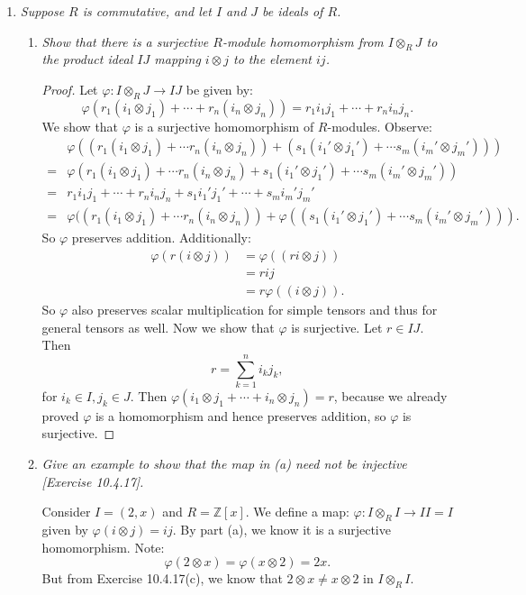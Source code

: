 \documentclass[9pt,reqno,twoside]{amsbook}
\theoremstyle{plain}
\numberwithin{section}{chapter}
\numberwithin{equation}{chapter}
\theoremstyle{definition}
\theoremstyle{remark}
\theoremstyle{plain}
\newcommand{\z}{\mathbb{Z}}
\newcommand{\bee}{\begin{equation}\begin{aligned}}
\newcommand{\eee}{\end{aligned}\end{equation}}
\newcommand{\tens}{\otimes}
\renewcommand{\phi}{\varphi}
\begin{document}
\begin{enumerate}[label=\arabic*.]
\item \textit{Suppose $R$ is commutative, and let $I$ and $J$ be ideals of $R$. }

\begin{enumerate}
\item \textit{Show that there is a surjective $R$-module homomorphism from $I \tens_R J$ to the product ideal $IJ$ mapping $i \tens j$ to the element $ij$. }

\begin{proof}
Let $\phi:I \tens_R J \to IJ$ be given by:
 $$
 \phi(r_1(i_1 \tens j_1) + \cdots + r_n(i_n \tens j_n)) = r_1i_1j_1 + \cdots + r_ni_nj_n.
 $$
  We show that $\phi$ is a surjective homomorphism of $R$-modules. Observe:
\bee
&\phi((r_1(i_1 \tens j_1) + \cdots r_n(i_n \tens j_n)) + (s_1(i_1' \tens j_1') + \cdots s_m(i_m' \tens j_m')))\\
= &\phi(r_1(i_1 \tens j_1) + \cdots r_n(i_n \tens j_n)+ s_1(i_1' \tens j_1') + \cdots s_m(i_m' \tens j_m'))\\
 = &r_1i_1j_1 + \cdots + r_ni_nj_n + s_1i_1'j_1' + \cdots + s_mi_m'j_m'\\
= &\phi((r_1(i_1 \tens j_1) + \cdots r_n(i_n \tens j_n)) + \phi((s_1(i_1' \tens j_1') + \cdots s_m(i_m' \tens j_m'))).
\eee
So $\phi$ preserves addition. Additionally:
\bee
\phi(r(i \tens j)) 
&= \phi((ri \tens j))\\
&= rij\\
&= r\phi((i \tens j)).
\eee
So $\phi$ also preserves scalar multiplication for simple tensors and thus for general tensors as well. Now we show that $\phi$ is surjective. Let $r \in IJ$. Then 
$$
r = \sum_{k = 1}^n i_kj_k,
$$ 
for $i_k \in I,j_k \in J$. Then $\phi(i_1 \tens j_1 + \cdots + i_n \tens j_n) = r$, because we already proved $\phi$ is a homomorphism and hence preserves addition, so $\phi$ is surjective. 
\end{proof}

\item \textit{Give an example to show that the map in (a) need not be injective [Exercise 10.4.17]. }


Consider $I = (2,x)$ and $R = \z[x]$. We define a map: $\phi:I \tens_R I \to II = I$ given by $\phi(i \tens j) = ij$. By part (a), we know it is a surjective homomorphism. Note:
$$
\phi(2 \tens x) = \phi(x \tens 2) = 2x.
$$
But from Exercise 10.4.17(c), we know that $2 \tens x \neq x \tens 2$ in $I \tens_R I$. 

\end{enumerate}
\end{enumerate}
\end{document}
